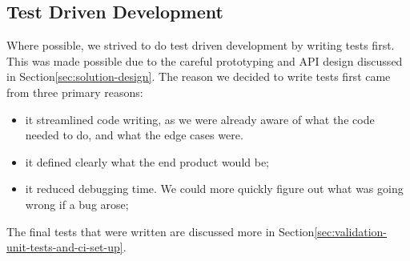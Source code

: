     \subsection{Test Driven Development}\label{subsec:test-driven-development}
    Where possible, we strived to do test driven development by writing tests first.
    This was made possible due to the careful prototyping and API design discussed in Section\eqref{sec:solution-design}.
    The reason we decided to write tests first came from three primary reasons:
    \begin{itemize}
        \item it streamlined code writing, as we were already aware of what the code needed to do, and what the edge cases
        were.
        \item it defined clearly what the end product would be;
        \item it reduced debugging time.
        We could more quickly figure out what was going wrong if a bug arose;
    \end{itemize}
    The final tests that were written are discussed more in Section\eqref{sec:validation-unit-tests-and-ci-set-up}.


